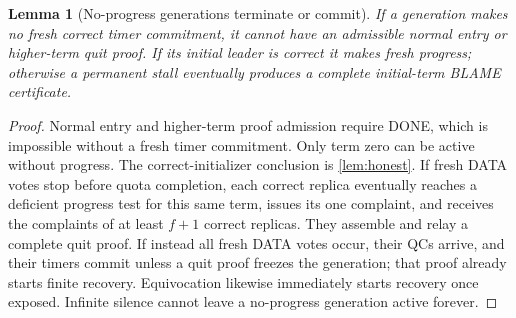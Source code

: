\documentclass[11pt,a4paper]{article}
\newtheorem{lemma}[lemma]{Lemma}
\begin{document}
\begin{lemma}[No-progress generations terminate or commit]
\label{lem:no-progress}
If a generation makes no fresh correct timer commitment, it cannot have
an admissible normal entry or higher-term quit proof. If its initial
leader is correct it makes fresh progress; otherwise a permanent stall
eventually produces a complete initial-term BLAME certificate.
\end{lemma}
\begin{proof}
Normal entry and higher-term proof admission require DONE, which is
impossible without a fresh timer commitment. Only term zero can be active
without progress. The correct-initializer conclusion is
\cref{lem:honest}. If fresh DATA votes stop before quota completion, each
correct replica eventually reaches a deficient progress test for this
same term, issues its one complaint, and receives the complaints of at
least $f+1$ correct replicas. They assemble and relay a complete quit
proof. If instead all fresh DATA votes occur, their QCs arrive, and their
timers commit unless a quit proof freezes the generation; that proof
already starts finite recovery. Equivocation likewise immediately starts
recovery once exposed. Infinite silence cannot leave a no-progress
generation active forever.
\end{proof}
\end{document}
